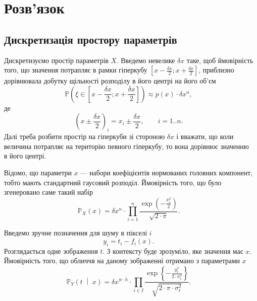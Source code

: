 \section{Розв'язок}

\subsection{Дискретизація простору параметрів}

Дискретизуємо простір параметрів $X$.
Введемо невелике $\delta x$ таке,
щоб ймовірність того, що значення потрапляє в рамки гіперкубу
$\left[ x - \frac{\delta x}{2}; x + \frac{\delta x}{2} \right]$,
приблизно дорівнювала добутку щільності розподілу в його центрі
на його об'єм
\begin{equation*}
  \mathbb{P}\left( \xi \in \left[ x - \frac{\delta x}{2};
                                  x + \frac{\delta x}{2} \right] \right)
  \approx p\left( x \right) \cdot \delta x^n,
\end{equation*}
де
\begin{equation*}
  \left( x \pm \frac{\delta x}{2} \right)_i = x_i \pm \frac{\delta x}{2},\qquad
  i = 1..n.
\end{equation*}
Далі треба розбити простір на гіперкуби
зі стороною $\delta x$ і вважати,
що коли величина потрапляє на територію певного гіперкубу,
то вона дорівнює значенню в його центрі.

Відомо, що параметри $x$ --- набори коефіцієнтів нормованих головних компонент,
тобто мають стандартний гаусовий розподіл.
Ймовірність того, що було згенеровано саме такий набір
\begin{equation*}
  \mathbb{P}_X\left( x \right)
  = \delta x^n \cdot \prod_{i=1}^n
    \frac{\exp{\left( - \frac{x_i^2}{2} \right)}}{\sqrt{2 \cdot \pi}}.
\end{equation*}

Введемо зручне позначення для шуму в пікселі $i$
\begin{equation*}
  y_i = t_i - f_i\left( x \right).
\end{equation*}
Розглядається одне зображення $t$.
З контексту буде зрозуміло, яке значення має $x$.
Ймовірність того, що обличчя на даному зображенні отримано з параметрами $x$
\begin{equation*}
  \mathbb{P}_Y\left( t \;\middle|\; x \right)
  = \delta x^{w \cdot h} \cdot \prod_{i \in I}
    \frac{\exp{\left\{- \frac{ y_i^2}
           {2 \cdot \sigma^2_t} \right\}}}
           {\sqrt{2 \cdot \pi \cdot \sigma^2_t}}.
\end{equation*}

